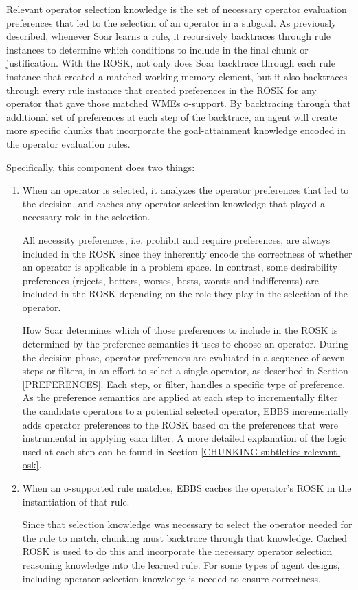 Relevant operator selection knowledge is the set of necessary operator evaluation preferences that led to the selection of an operator in a subgoal.  As previously described, whenever Soar learns a rule, it recursively backtraces through rule instances to determine which conditions to include in the final chunk or justification. With the ROSK, not only does Soar backtrace through each rule instance that created a matched working memory element, but it also backtraces through every rule instance that created preferences in the ROSK for any operator that gave those matched WMEs o-support. By backtracing through that additional set of preferences at each step of the backtrace, an agent will create more specific chunks that incorporate the goal-attainment knowledge encoded in the operator evaluation rules.

Specifically, this component does two things:

\begin{enumerate}
	\item When an operator is selected, it analyzes the operator preferences that led to the decision, and caches any operator selection knowledge that played a necessary role in the selection.

	All necessity preferences, i.e. prohibit and require preferences, are always included in the ROSK since they inherently encode the correctness of whether an operator is applicable in a problem space. In contrast, some desirability preferences (rejects, betters, worses, bests, worsts and indifferents) are included in the ROSK depending on the role they play in the selection of the operator.

	How Soar determines which of those preferences to include in the ROSK is determined by the preference semantics it uses to choose an operator. During the decision phase, operator preferences are evaluated in a sequence of seven steps or filters, in an effort to select a single operator, as described in Section \ref{PREFERENCES}.  Each step, or filter, handles a specific type of preference.  As the preference semantics are applied at each step to incrementally filter the candidate operators to a potential selected operator, EBBS incrementally adds operator preferences to the ROSK based on the preferences that were instrumental in applying each filter.  A more detailed explanation of the logic used at each step can be found in Section \ref{CHUNKING-subtleties-relevant-osk}.

	\item When an o-supported rule matches, EBBS caches the operator's ROSK in the instantiation of that rule.

	Since that selection knowledge was necessary to select the operator needed for the rule to match, chunking must backtrace through that knowledge.  Cached ROSK is used to do this and incorporate the necessary operator selection reasoning knowledge into the learned rule.  For some types of agent designs, including operator selection knowledge is needed to ensure correctness.
\end{enumerate}

